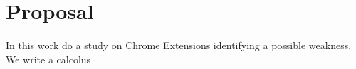 


\section{Proposal} 
\label{sec:Proposal} 
In this work do a study on Chrome Extensions identifying a possible weakness. We write a calcolus 
